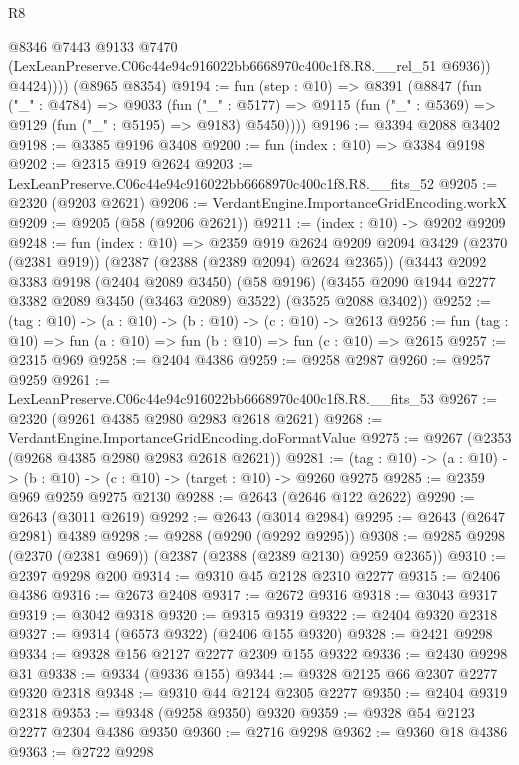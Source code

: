 \begin{lexlean}{R8}
\begin{coremodule}
              @8346
              @7443
              @9133
              @7470
              (LexLeanPreserve.C06c44e94c916022bb6668970c400c1f8.R8.__rel_51 @6936))
            @4424))))
    (@8965 @8354)
@9194 := fun (step : @10) =>
  @8391
    (@8847
      (fun ("_" : @4784) =>
      @9033
        (fun ("_" : @5177) =>
        @9115 (fun ("_" : @5369) => @9129 (fun ("_" : @5195) => @9183) @5450))))
@9196 := @3394 @2088 @3402
@9198 := @3385 @9196 @3408
@9200 := fun (index : @10) => @3384 @9198
@9202 := @2315 @919 @2624
@9203 := LexLeanPreserve.C06c44e94c916022bb6668970c400c1f8.R8.__fits_52
@9205 := @2320 (@9203 @2621)
@9206 := VerdantEngine.ImportanceGridEncoding.workX
@9209 := @9205 (@58 (@9206 @2621))
@9211 := (index : @10) -> @9202 @9209
@9248 := fun (index : @10) =>
  @2359
    @919
    @2624
    @9209
    @2094
    @3429
    (@2370 (@2381 @919))
    (@2387 (@2388 (@2389 @2094) @2624 @2365))
    (@3443
      @2092
      @3383
      @9198
      (@2404 @2089 @3450)
      (@58 @9196)
      (@3455 @2090 @1944 @2277 @3382 @2089 @3450 (@3463 @2089) @3522)
      (@3525 @2088 @3402))
@9252 := (tag : @10) -> (a : @10) -> (b : @10) -> (c : @10) -> @2613
@9256 := fun (tag : @10) => fun (a : @10) => fun (b : @10) => fun (c : @10) => @2615
@9257 := @2315 @969
@9258 := @2404 @4386
@9259 := @9258 @2987
@9260 := @9257 @9259
@9261 := LexLeanPreserve.C06c44e94c916022bb6668970c400c1f8.R8.__fits_53
@9267 := @2320 (@9261 @4385 @2980 @2983 @2618 @2621)
@9268 := VerdantEngine.ImportanceGridEncoding.doFormatValue
@9275 := @9267 (@2353 (@9268 @4385 @2980 @2983 @2618 @2621))
@9281 := (tag : @10) -> (a : @10) -> (b : @10) -> (c : @10) -> (target : @10) -> @9260 @9275
@9285 := @2359 @969 @9259 @9275 @2130
@9288 := @2643 (@2646 @122 @2622)
@9290 := @2643 (@3011 @2619)
@9292 := @2643 (@3014 @2984)
@9295 := @2643 (@2647 @2981) @4389
@9298 := @9288 (@9290 (@9292 @9295))
@9308 := @9285 @9298 (@2370 (@2381 @969)) (@2387 (@2388 (@2389 @2130) @9259 @2365))
@9310 := @2397 @9298 @200
@9314 := @9310 @45 @2128 @2310 @2277
@9315 := @2406 @4386
@9316 := @2673 @2408
@9317 := @2672 @9316
@9318 := @3043 @9317
@9319 := @3042 @9318
@9320 := @9315 @9319
@9322 := @2404 @9320 @2318
@9327 := @9314 (@6573 @9322) (@2406 @155 @9320)
@9328 := @2421 @9298
@9334 := @9328 @156 @2127 @2277 @2309 @155 @9322
@9336 := @2430 @9298 @31
@9338 := @9334 (@9336 @155)
@9344 := @9328 @2125 @66 @2307 @2277 @9320 @2318
@9348 := @9310 @44 @2124 @2305 @2277
@9350 := @2404 @9319 @2318
@9353 := @9348 (@9258 @9350) @9320
@9359 := @9328 @54 @2123 @2277 @2304 @4386 @9350
@9360 := @2716 @9298
@9362 := @9360 @18 @4386
@9363 := @2722 @9298

\end{coremodule}
\end{lexlean}
